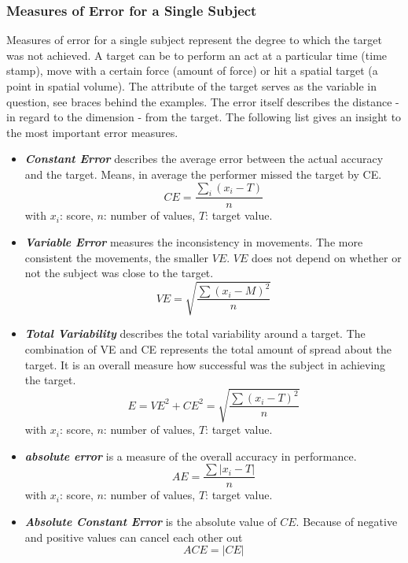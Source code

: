 \subsubsection{Measures of Error for a Single Subject}
Measures of error for a single subject represent the degree to which the target was not achieved. A target can be to perform an act at a particular time (time stamp), move with a certain force (amount of force) or hit a spatial target (a point in spatial volume). The attribute of the target serves as the variable in question, see braces behind the examples. The error itself describes the distance - in regard to the dimension - from the target. The following list gives an insight to the most important error measures.
\begin{itemize}
	\item \textbf{\textit{Constant Error}} describes the average error between the actual accuracy and the target. Means, in average the performer missed the target by CE.
	\begin{equation}
		CE=\frac{\sum_i(x_i-T)}{n}
	\end{equation}
	\label{eq:constanterror}
	with $x_i$: score, $n$: number of values, $T$: target value.
	\item \textbf{\textit{Variable Error}} measures the inconsistency in movements. The more consistent the movements, the smaller $VE$. $VE$ does not depend on whether or not the subject was close to the target.
	\begin{equation}
		VE=\sqrt{\frac{\sum(x_i-M)^2}{n}}	
	\end{equation}
	\item \textbf{\textit{Total Variability}} describes the total variability around a target. The combination of VE and CE represents the total amount of spread about the target. It is an overall measure how successful was the subject in achieving the target.
	\begin{equation}
		E=VE^2+CE^2=\sqrt{\frac{\sum(x_i-T)^2}{n}}
	\end{equation}
	with $x_i$: score, $n$: number of values, $T$: target value.
	\item \textbf{\textit{absolute error}} is a measure of the overall accuracy in performance.
	\begin{equation}
		AE=\frac{\sum|x_i-T|}{n}
	\end{equation}
	with $x_i$: score, $n$: number of values, $T$: target value.
	\item \textbf{\textit{Absolute Constant Error}} is the absolute value of $CE$. Because of negative and positive values can cancel each other out
	\begin{equation}
		ACE = |CE|
	\end{equation}
\end{itemize}


